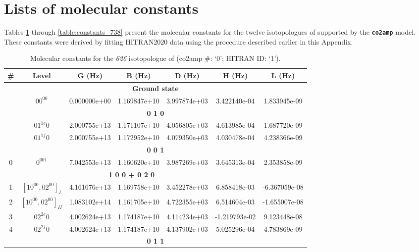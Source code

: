 \section*{Lists of molecular constants}

Tables \ref{table:constants_626} through \ref{table:constants_738} present the molecular constants for the twelve isotopologues of  supported by the \textbf{\texttt{co2amp}} model. These constants were derived by fitting HITRAN2020 data using the procedure described earlier in this Appendix.



\begin{table}[h!]
\caption{Molecular constants for the \textit{626} isotopologue of  (co2amp \#: ‘0’; HITRAN ID: ‘1’).}
\label{table:constants_626}
\centering
\begin{tabular}{|c|c|c|c|c|c|c|}
\hline
\textbf{\#} & \textbf{Level} & \textbf{G (Hz)} & \textbf{B (Hz)} & \textbf{D (Hz)} & \textbf{H (Hz)} & \textbf{L (Hz)} \\ \hline
\multicolumn{7}{|c|}{\textbf{Ground state}} \\ \hline
 & $00^00$ & 0.000000e+00 & 1.169847e+10 & 3.997874e+03 & 3.422140e-04 & 1.833945e-09 \\ \hline
\multicolumn{7}{|c|}{\textbf{0 1 0}} \\ \hline
 & $01^{1e}0$ & 2.000755e+13 & 1.171107e+10 & 4.056805e+03 & 4.613985e-04 & 1.687720e-09 \\ \hline
 & $01^{1f}0$ & 2.000755e+13 & 1.172952e+10 & 4.079350e+03 & 4.030478e-04 & 4.238366e-09 \\ \hline
\multicolumn{7}{|c|}{\textbf{0 0 1}} \\ \hline
0 & $0^001$ & 7.042553e+13 & 1.160620e+10 & 3.987269e+03 & 3.645313e-04 & 2.353858e-09 \\ \hline
\multicolumn{6}{|c|}{\textbf{1 0 0 + 0 2 0}} \\ \hline
1 & $[10^00, 02^00]_{I}$ & 4.161676e+13 & 1.169758e+10 & 3.452278e+03 & 6.858418e-03 & -6.367059e-08 \\ \hline
2 & $[10^00, 02^00]_{II}$ & 1.083102e+14 & 1.161705e+10 & 4.722355e+03 & 6.514604e-03 & -1.655007e-08 \\ \hline
3 & $02^{2e}0$ & 4.002624e+13 & 1.174187e+10 & 4.114234e+03 & -1.219793e-02 & 9.123448e-08 \\ \hline
4 & $02^{2f}0$ & 4.002624e+13 & 1.174187e+10 & 4.137902e+03 & 5.025296e-04 & 4.783869e-09 \\ \hline
\multicolumn{7}{|c|}{\textbf{0 1 1}} \\ \hline

\end{tabular}
\end{table}
